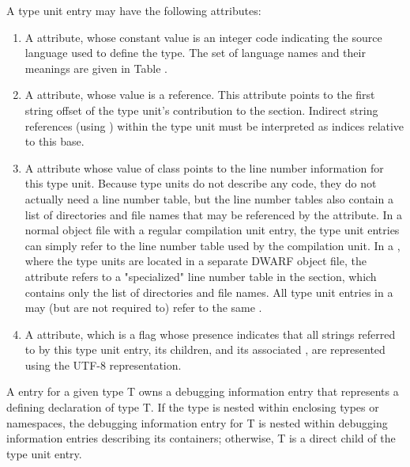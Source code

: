 A type unit entry may have the following attributes:
\begin{enumerate}[1. ]

\item A 
\DWATlanguage{} attribute, 
whose
constant value is an integer code indicating the source
language used to define the type. The set of language names
and their meanings are given in Table .

\item A 
\DWATstroffsetsbase{}
attribute, whose value is a reference. This attribute points
to the first string offset of the type unit's contribution to
the \dotdebugstroffsets{} section. Indirect string references
(using \DWFORMstrx) within the type unit must be interpreted
as indices relative to this base.

\item A \DWATstmtlist{} attribute
whose value of class \CLASSlineptr{} points to the line number 
information for this type unit.
Because type units do not describe any code, they
do not actually need a line number table, but the line number
tables also contain a list of directories and file names that
may be referenced by the \DWATdeclfile{} attribute. In a
normal object file with a regular compilation unit entry, the
type unit entries can simply refer to the line number table
used by the compilation unit. In a \splitDWARFobjectfile, where
the type units are located in a separate DWARF object file,
the \DWATstmtlist{} attribute refers to a "specialized"
line number table in the \dotdebuglinedwo{} section, which
contains only the list of directories and file names. All
type unit entries in a \splitDWARFobjectfile{} may (but are not
required to) refer to the same .

\item A \DWATuseUTFeight{} attribute, which is a flag
whose presence indicates that all strings referred to by this type
unit entry, its children, and its associated 
, 
are represented using the UTF-8 representation.

\end{enumerate}

A  entry for a given type T owns a debugging
information entry that represents a defining declaration
of type T. If the type is nested within enclosing types or
namespaces, the debugging information entry for T is nested
within debugging information entries describing its containers;
otherwise, T is a direct child of the type unit entry.

